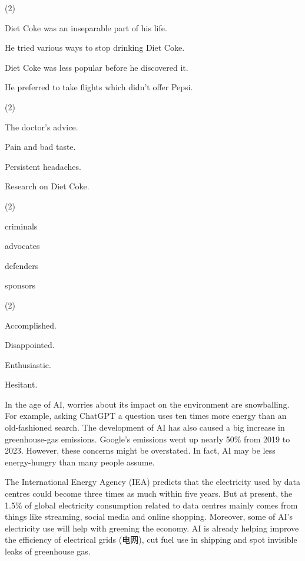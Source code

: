 \documentclass{英语试卷}
\begin{document}
\begin{choices}(2)
  \item Diet Coke was an inseparable part of his life.
  \item He tried various ways to stop drinking Diet Coke.
  \item Diet Coke was less popular before he discovered it.
  \item He preferred to take flights which didn't offer Pepsi.
\end{choices}
\begin{choices}(2)
  \item The doctor's advice.
  \item Pain and bad taste.
  \item Persistent headaches.
  \item Research on Diet Coke.
\end{choices}
\begin{choices}(2)
  \item criminals
  \item advocates
  \item defenders
  \item sponsors
\end{choices}
\begin{choices}(2)
  \item Accomplished.
  \item Disappointed.
  \item Enthusiastic.
  \item Hesitant.
\end{choices}
\par In the age of AI, worries about its impact on the environment are snowballing. For example, asking ChatGPT a question uses ten times more energy than an old-fashioned search. The development of AI has also caused a big increase in greenhouse-gas emissions. Google's emissions went up nearly 50\% from 2019 to 2023. However, these concerns might be overstated. In fact, AI may be less energy-hungry than many people assume.\par
\par The International Energy Agency (IEA) predicts that the electricity used by data centres could become three times as much within five years. But at present, the 1.5\% of global electricity consumption related to data centres mainly comes from things like streaming, social media and online shopping. Moreover, some of AI's electricity use will help with greening the economy. AI is already helping improve the efficiency of electrical grids (电网), cut fuel use in shipping and spot invisible leaks of greenhouse gas.\par
\end{document}
